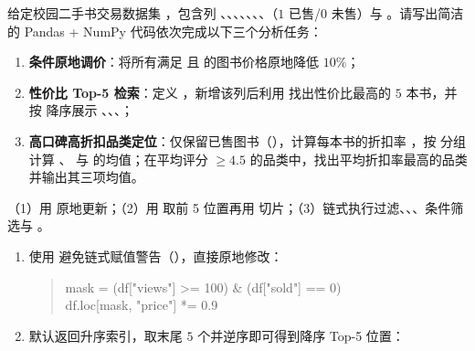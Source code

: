 \begin{exercise}[title={校园二手书市场 EDA 综合分析流水线},level=advanced,points=20,tags={EDA,Pandas,NumPy,综合分析}]
给定校园二手书交易数据集 ，包含列 、、、、、、、（$1$ 已售/$0$ 未售）与 。请写出简洁的 Pandas + NumPy 代码依次完成以下三个分析任务：
\begin{enumerate}
  \item \textbf{条件原地调价}：将所有满足  且  的图书价格原地降低 $10\%$；
  \item \textbf{性价比 Top-5 检索}：定义 ，新增该列后利用  找出性价比最高的 $5$ 本书，并按  降序展示 、、、；
  \item \textbf{高口碑高折扣品类定位}：仅保留已售图书（），计算每本书的折扣率 ，按  分组计算 、 与  的均值；在平均评分 $\ge 4.5$ 的品类中，找出平均折扣率最高的品类并输出其三项均值。
\end{enumerate}
\begin{answer}
（1）用  原地更新；（2）用  取前 5 位置再用  切片；（3）链式执行过滤、、、条件筛选与 。
\end{answer}
\begin{solution}
\begin{enumerate}
  \item 使用  避免链式赋值警告（），直接原地修改：
  \begin{quote}\ttfamily\small
    mask = (df["views"] >= 100) \& (df["sold"] == 0)\\
    df.loc[mask, "price"] *= 0.9
  \end{quote}
  \item {} 默认返回升序索引，取末尾 $5$ 个并逆序即可得到降序 Top-5 位置：
  \begin{quote}\ttfamily\small

\end{quote}
\end{enumerate}
\end{solution}
\end{exercise}
